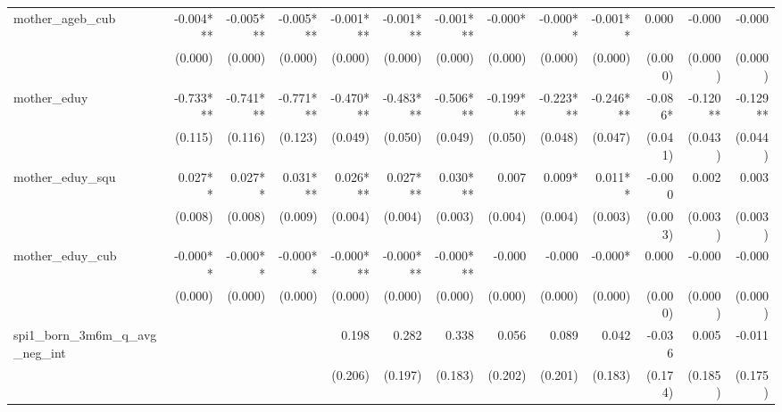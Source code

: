 \begin{tabular}{lrrrrrrrrrrrr}
mother\_ageb\_cub                           &    -0.004*** &    -0.005*** &    -0.005*** &    -0.001*** &    -0.001*** &    -0.001*** &      -0.000* &     -0.000** &     -0.001** &        0.000 &       -0.000 &       -0.000 \\ 
                                            &      (0.000) &      (0.000) &      (0.000) &      (0.000) &      (0.000) &      (0.000) &      (0.000) &      (0.000) &      (0.000) &      (0.000) &      (0.000) &      (0.000) \\ 
mother\_eduy                                &    -0.733*** &    -0.741*** &    -0.771*** &    -0.470*** &    -0.483*** &    -0.506*** &    -0.199*** &    -0.223*** &    -0.246*** &      -0.086* &     -0.120** &     -0.129** \\ 
                                            &      (0.115) &      (0.116) &      (0.123) &      (0.049) &      (0.050) &      (0.049) &      (0.050) &      (0.048) &      (0.047) &      (0.041) &      (0.043) &      (0.044) \\ 
mother\_eduy\_squ                           &      0.027** &      0.027** &     0.031*** &     0.026*** &     0.027*** &     0.030*** &        0.007 &       0.009* &      0.011** &       -0.000 &        0.002 &        0.003 \\ 
                                            &      (0.008) &      (0.008) &      (0.009) &      (0.004) &      (0.004) &      (0.003) &      (0.004) &      (0.004) &      (0.003) &      (0.003) &      (0.003) &      (0.003) \\ 
mother\_eduy\_cub                           &     -0.000** &     -0.000** &     -0.000** &    -0.000*** &    -0.000*** &    -0.000*** &       -0.000 &       -0.000 &      -0.000* &        0.000 &       -0.000 &       -0.000 \\ 
                                            &      (0.000) &      (0.000) &      (0.000) &      (0.000) &      (0.000) &      (0.000) &      (0.000) &      (0.000) &      (0.000) &      (0.000) &      (0.000) &      (0.000) \\ 
spi1\_born\_3m6m\_q\_avg\_neg\_int          &              &              &              &        0.198 &        0.282 &        0.338 &        0.056 &        0.089 &        0.042 &       -0.036 &        0.005 &       -0.011 \\ 
                                            &              &              &              &      (0.206) &      (0.197) &      (0.183) &      (0.202) &      (0.201) &      (0.183) &      (0.174) &      (0.185) &      (0.175) \\ 

\end{tabular}
